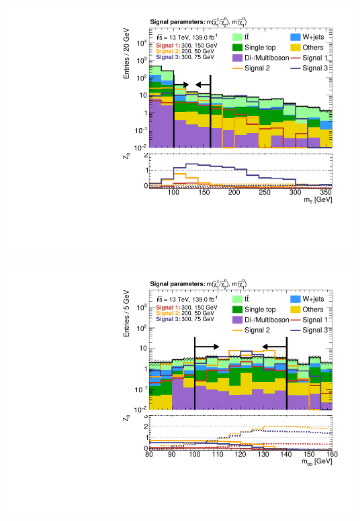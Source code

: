 \begin{figure}
\begin{subfigure}[b]{0.4\linewidth}
		\centering\includegraphics[width=\textwidth]{n1_SRLM_mct_bins/mt_both.pdf}
		\caption{\label{fig:Wh_reopt_second_round_n1_srlm_mbb_lower}}
	\end{subfigure}%
	\begin{subfigure}[b]{0.4\linewidth}
		\centering\includegraphics[width=\textwidth]{n1_SRLM_mct_bins/mbb_both.pdf}
		\caption{\label{fig:Wh_reopt_second_round_n1_srlm_mbb_upper}}
	\end{subfigure}
	\begin{subfigure}[b]{0.4\linewidth}

\end{subfigure}
\end{figure}
